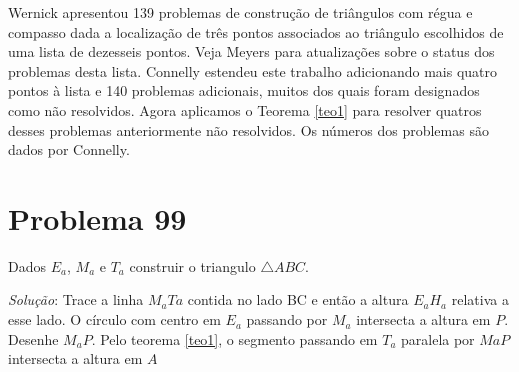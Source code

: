 \documentclass[12pt, openright, a4paper, brazil, openany, oneside]{abntex2}
\begin{document}
Wernick\cite{Wernick} apresentou 139 problemas de construção de triângulos com régua e compasso dada a localização de três pontos associados ao triângulo escolhidos de uma lista de dezesseis pontos. Veja Meyers\cite{Meyers} para atualizações sobre o status dos problemas desta lista. Connelly \cite{con} estendeu este trabalho adicionando mais quatro pontos à lista e 140 problemas adicionais, muitos dos quais foram designados como não resolvidos. Agora aplicamos o Teorema \ref{teo1} para resolver quatros desses problemas anteriormente não resolvidos. Os números dos problemas são dados por Connelly.

\section{Problema 99}

Dados $E_a$, $M_a$ e $T_a$ construir o triangulo $\triangle ABC$.

\textit{Solução}: Trace a linha $M_{a}T{a}$ contida no lado BC e então a altura $E_{a}H_{a}$ relativa a esse lado. O círculo com centro em $E_{a}$ passando por $M_{a}$ intersecta a altura em $P$. Desenhe $M_{a}P$. Pelo teorema \ref{teo1}, o segmento passando em $T_{a}$ paralela por $M{a}P$ intersecta a altura em $A$



\end{document}
